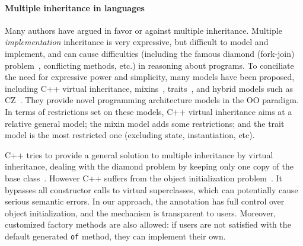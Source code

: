 \paragraph{Multiple inheritance in \objectoriented languages}
Many authors have argued in favor or against multiple inheritance.
Multiple \emph{implementation}
inheritance is very expressive, but difficult to model and implement, and can
cause difficulties (including the famous diamond (fork-join)
problem~\cite{bracha90mixin,Sak89dis}, conflicting methods, etc.) in reasoning about
programs. To conciliate the need for expressive power and simplicity, many
models have been proposed, including C++ virtual inheritance,
mixins~\cite{bracha90mixin}, traits~\cite{scharli03traits}, and hybrid models
such as CZ~\cite{malayeri2009cz}.  They provide novel programming architecture
models in the OO paradigm. In terms of restrictions set on these models, C++
virtual inheritance aims at a relative general model; the mixin model adds some
restrictions; and the trait model is the most restricted one (excluding
state, instantiation, etc).

C++ tries to provide a general solution to multiple inheritance by
virtual inheritance, dealing with the diamond problem by keeping only
one copy of the base class~\cite{ellis1990annotated}. However C++
suffers from the object initialization problem~\cite{malayeri2009cz}.
It bypasses all constructor calls to virtual superclasses, which can
potentially cause serious semantic errors. In our approach, the \mixin
annotation has full control over object initialization,
and the mechanism is transparent to users. Moreover, customized factory
methods are also allowed: if users are not satisfied with the default
generated \texttt{of} method, they can implement their own.

